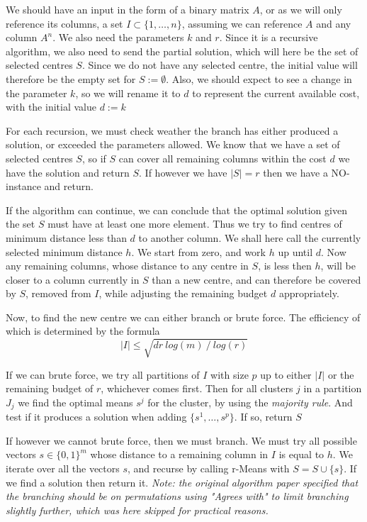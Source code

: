 \documentclass[a4paper]{article}
\begin{document}
We should have an input in the form of a binary matrix $A$, or as we will only reference its columns, a set
$I \subset \{1,\dots,n\}$, assuming we can reference $A$ and any column $A^n$. We also need the parameters $k$ and $r$.
Since it is a recursive algorithm, we also need to send the partial solution, which will here be the set of selected
centres $S$. Since we do not have any selected centre, the initial value will therefore be the empty set for
$S := \emptyset$. Also, we should expect to see a change in the parameter $k$, so we will rename it to $d$ to represent the
current available cost, with the initial value $d := k$

For each recursion, we must check weather the branch has either produced a solution, or exceeded the parameters allowed. We know that
we have a set of selected centres $S$, so if $S$ can cover all remaining columns within the cost $d$ we have the solution and return $S$.
If however we have $|S| = r$ then we have a NO-instance and return.

If the algorithm can continue, we can conclude that the optimal solution given the set $S$ must have at least one more element. Thus
we try to find centres of minimum distance less than $d$ to another column. We shall here call the currently selected minimum
distance $h$. We start from zero, and work $h$ up until $d$. Now any remaining columns, whose distance to any centre in $S$,
is less then $h$, will be closer to a column currently in $S$ than a new centre, and can therefore be covered by $S$,
removed from $I$, while adjusting the remaining budget $d$ appropriately.

Now, to find the new centre we can either branch or brute force. The efficiency of which is determined by the formula
\[
    |I| \leq \sqrt{d r ~log(m) ~/ ~log(r)}
\]

If we can brute force, we try all partitions of $I$ with size $p$ up to either $|I|$ or the remaining budget of $r$, whichever comes first. Then
for all clusters $j$ in a partition $J_j$ we find the optimal means $s^j$ for the cluster, by using the \textit{majority rule}. And test if it produces
a solution when adding $\{s^1,\dots,s^p\}$. If so, return $S$

If however we cannot brute force, then we must branch. We must try all possible vectors $s \in \{0,1\}^m$ whose distance to a remaining column in $I$
is equal to $h$. We iterate over all the vectors $s$, and recurse by calling r-Means with $S= S\cup\{s\}$. If we find a solution then return it.
\textit{Note: the original algorithm paper \cite{fomin_golovach_panolan_2020} specified that the branching should be on permutations using "Agrees with"
    to limit branching slightly further, which was here skipped for practical reasons.}
\end{document}
